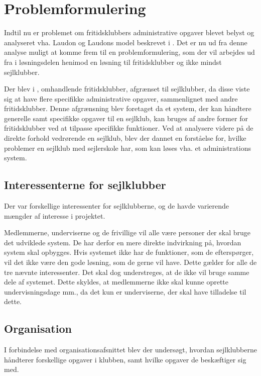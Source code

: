 \chapter{Problemformulering}\label{chap:problemformulering-new}

Indtil nu er problemet om fritidsklubbers administrative opgaver blevet belyst og analyseret vha. Laudon og Laudons model beskrevet i . 
Det er nu ud fra denne analyse muligt at komme frem til en problemformulering, som der vil arbejdes ud fra i løsningsdelen henimod en løsning til fritidsklubber og ikke mindst sejlklubber.

Der blev i , omhandlende fritidsklubber, afgrænset til sejlklubber, da disse viste sig at have flere specifikke administrative opgaver, sammenlignet med andre fritidsklubber. 
Denne afgrænsning blev foretaget da et system, der kan håndtere generelle samt specifikke opgaver til en sejlklub, kan bruges af andre former for fritidsklubber ved at tilpasse specifikke funktioner.
Ved at analysere videre på de direkte forhold vedrørende en sejlklub, blev der dannet en forståelse for, hvilke problemer en sejlklub med sejlerskole har, som kan løses vha. et administrations system.


\section{Interessenterne for sejlklubber}

Der var forskellige interessenter for sejlklubberne, og de havde varierende mængder af interesse i projektet.

Medlemmerne, underviserne og de frivillige vil alle være personer der skal bruge det udviklede system. 
De har derfor en mere direkte indvirkning på, hvordan system skal opbygges. 
Hvis systemet ikke har de funktioner, som de efterspørger, vil det ikke være den gode løsning, som de gerne vil have. 
Dette gælder for alle de tre nævnte interessenter. 
Det skal dog understreges, at de ikke vil bruge samme dele af systemet. 
Dette skyldes, at medlemmerne ikke skal kunne oprette undervisningsdage mm., da det kun er underviserne, der skal have tilladelse til dette. 

\section{Organisation}

I forbindelse med organisationsafsnittet blev der undersøgt, hvordan sejlklubberne håndterer forskellige opgaver i klubben, samt hvilke opgaver de beskæftiger sig med.

